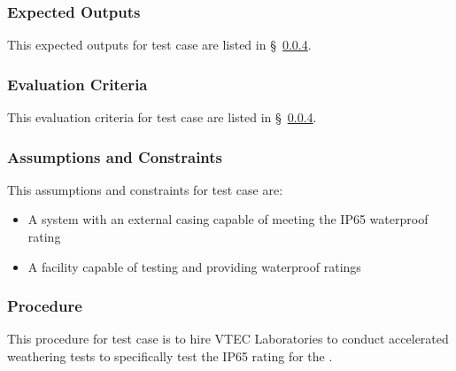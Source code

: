 \subsubsection{Expected Outputs}
\label{loc:TestCaseExpectedOutputs\StsTestSpecID\StsTestCaseID}
% 

This expected outputs for test  case  are listed in \S~\ref{loc:TestCaseProcedure\StsTestSpecID\StsTestCaseID}.

\subsubsection{Evaluation Criteria}
\label{loc:TestCaseEvaluationCriteria\StsTestSpecID\StsTestCaseID}
% 

This evaluation criteria for test  case  are listed in \S~\ref{loc:TestCaseProcedure\StsTestSpecID\StsTestCaseID}.

\subsubsection{Assumptions and Constraints}
\label{loc:TestCaseAssumptions\StsTestSpecID\StsTestCaseID}
% 

This assumptions and constraints for test  case  are:

\begin{itemize}
    \item A system with an external casing capable of meeting the IP65 waterproof rating
    \item A facility capable of testing and providing waterproof ratings
\end{itemize}

\subsubsection{Procedure}
\label{loc:TestCaseProcedure\StsTestSpecID\StsTestCaseID}
% 

This procedure for test  case  is to hire VTEC Laboratories to conduct accelerated weathering tests to specifically test the IP65 rating for the \ThisSystem.

